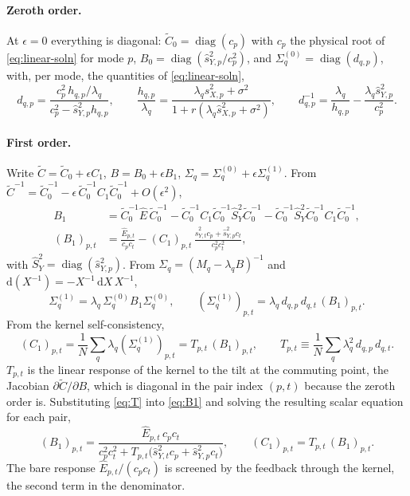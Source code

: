 \documentclass[11pt,a4paper]{article}
\newcommand{\diag}{\operatorname{diag}}
\newcommand{\Ct}{\tilde C}
\begin{document}
\paragraph{Zeroth order.}
At $\epsilon = 0$ everything is diagonal: $\Ct_0 = \diag(c_p)$ with $c_p$ the physical root of \eqref{eq:linear-soln} for mode $p$, $B_0 = \diag(\hat s_{Y,p}^2/c_p^2)$, and $\Sigma_q^{(0)} = \diag(d_{q,p})$, with, per mode, the quantities of \eqref{eq:linear-soln},
\begin{equation}
  d_{q,p} = \frac{c_p^2\,h_{q,p}/\lambda_q}{c_p^2 - \hat s_{Y,p}^2 h_{q,p}},\qquad
  \frac{h_{q,p}}{\lambda_q} = \frac{\lambda_q\hat s_{X,p}^2 + \sigma^2}{1 + r(\lambda_q\hat s_{X,p}^2 + \sigma^2)},\qquad
  d_{q,p}^{-1} = \frac{\lambda_q}{h_{q,p}} - \frac{\lambda_q\hat s_{Y,p}^2}{c_p^2}.
\end{equation}

\paragraph{First order.}
Write $\Ct = \Ct_0 + \epsilon C_1$, $B = B_0 + \epsilon B_1$, $\Sigma_q = \Sigma_q^{(0)} + \epsilon\Sigma_q^{(1)}$. From $\Ct^{-1} = \Ct_0^{-1} - \epsilon\,\Ct_0^{-1}C_1\Ct_0^{-1} + O(\epsilon^2)$,
\begin{equation}
\begin{aligned}
  B_1 &= \Ct_0^{-1}\hat E\,\Ct_0^{-1} - \Ct_0^{-1}C_1\Ct_0^{-1}\hat S_Y^2\Ct_0^{-1} - \Ct_0^{-1}\hat S_Y^2\Ct_0^{-1}C_1\Ct_0^{-1},\\
  (B_1)_{p,t} &= \frac{\hat E_{p,t}}{c_pc_t} - (C_1)_{p,t}\,\frac{\hat s_{Y,t}^2c_p + \hat s_{Y,p}^2c_t}{c_p^2c_t^2},
\end{aligned}
  \label{eq:B1}
\end{equation}
with $\hat S_Y^2 = \diag(\hat s_{Y,p}^2)$.
From $\Sigma_q = (M_q - \lambda_q B)^{-1}$ and $\mathrm d(X^{-1}) = -X^{-1}\,\mathrm dX\,X^{-1}$,
\begin{equation}
  \Sigma_q^{(1)} = \lambda_q\,\Sigma_q^{(0)} B_1 \Sigma_q^{(0)},\qquad
  (\Sigma_q^{(1)})_{p,t} = \lambda_q\, d_{q,p}\,d_{q,t}\,(B_1)_{p,t}.
  \label{eq:Sigma1}
\end{equation}
From the kernel self-consistency,
\begin{equation}
  (C_1)_{p,t} = \frac1N\sum_q\lambda_q(\Sigma_q^{(1)})_{p,t} = T_{p,t}\,(B_1)_{p,t},
  \qquad
  T_{p,t} \equiv \frac1N\sum_q \lambda_q^2\, d_{q,p}\, d_{q,t}.
  \label{eq:T}
\end{equation}
$T_{p,t}$ is the linear response of the kernel to the tilt at the commuting point, the Jacobian $\partial\Ct/\partial B$, which is diagonal in the pair index $(p,t)$ because the zeroth order is. Substituting \eqref{eq:T} into \eqref{eq:B1} and solving the resulting scalar equation for each pair,
\begin{equation}
  \boxed{\;
  (B_1)_{p,t} = \frac{\hat E_{p,t}\,c_pc_t}{c_p^2c_t^2 + T_{p,t}\big(\hat s_{Y,t}^2c_p + \hat s_{Y,p}^2c_t\big)},
  \qquad
  (C_1)_{p,t} = T_{p,t}\,(B_1)_{p,t}.\;}
  \label{eq:first-order}
\end{equation}
The bare response $\hat E_{p,t}/(c_pc_t)$ is screened by the feedback through the kernel, the second term in the denominator.
\end{document}
